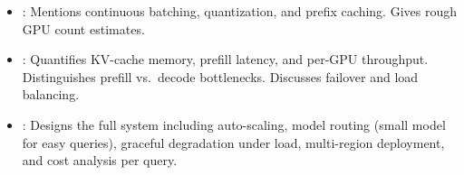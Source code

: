 \begin{interviewq}
\goodgreat
\begin{itemize}
    \item {}: Mentions continuous batching, quantization, and prefix
          caching.  Gives rough GPU count estimates.
    \item {}: Quantifies KV-cache memory, prefill latency, and per-GPU
          throughput.  Distinguishes prefill vs.\ decode bottlenecks.  Discusses
          failover and load balancing.
    \item {}: Designs the full system including auto-scaling, model
          routing (small model for easy queries), graceful degradation under load,
          multi-region deployment, and cost analysis per query.
\end{itemize}

\end{interviewq}

\vspace{0.5em}

